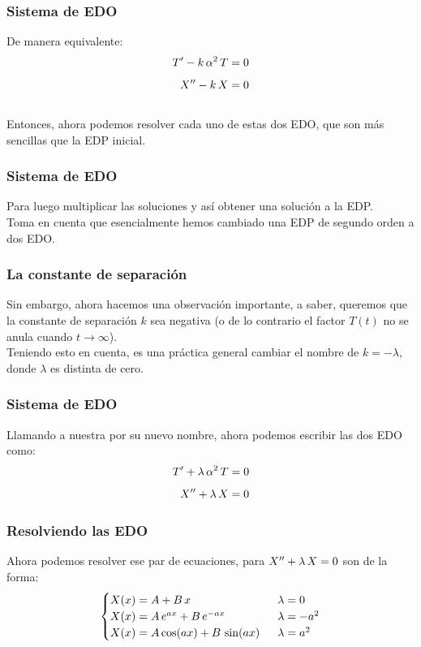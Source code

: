 \documentclass[12pt]{beamer}
\begin{document}
\begin{frame}
\frametitle{Sistema de EDO}
De manera equivalente:
\pause
\begin{align*}
{T}^{\prime} - k \, \alpha^{2} \, T &= 0 \\[0.5em]
{X}^{\prime \prime} - k \, X &= 0
\end{align*}
\\
\bigskip
\pause
Entonces, ahora podemos resolver cada uno de estas dos EDO, que son más sencillas que la EDP inicial.
\end{frame}
\begin{frame}
\frametitle{Sistema de EDO}
Para luego multiplicar las soluciones y así obtener una solución a la EDP.
\\
\bigskip
\pause
Toma en cuenta que esencialmente hemos cambiado una EDP de segundo orden a dos EDO.
\end{frame}
\begin{frame}
\frametitle{La constante de separación}
Sin embargo, ahora hacemos una observación importante, a saber, queremos que la constante de separación $k$ sea negativa (o de lo contrario el factor $T (t)$ no se anula cuando $t \to \infty$).
\\
\bigskip
\pause
Teniendo esto en cuenta, es una práctica general cambiar el nombre de $k = - \lambda$, donde $\lambda$ es distinta de cero.
\end{frame}
\begin{frame}
\frametitle{Sistema de EDO}
Llamando a nuestra  por su nuevo nombre, ahora podemos escribir las dos EDO como:
\pause
\begin{align*}
{T}^{\prime} + \lambda \, \alpha^{2} \, T &= 0 \\[0.5em]
{X}^{\prime \prime} + \lambda \, X &= 0
\end{align*}
\end{frame}
\begin{frame}
\frametitle{Resolviendo las EDO}
Ahora podemos resolver ese par de ecuaciones, para ${X}^{\prime \prime} + \lambda \, X = 0$ son de la forma:
\pause
\begin{align}
\begin{cases}
X (x) = A + B \, x & \hspace{0.2cm} \lambda = 0 \\
X (x) = A \, e^{a x} + B \, e^{-a x} & \hspace{0.2cm} \lambda = - a^{2} \\
X (x) = A \cos (a x ) + B \, \sin (a x) & \hspace{0.2cm} \lambda = a^{2}
\end{cases}
\label{eq:ecuacion_06_02_31}
\end{align}
\end{frame}
\end{document}
